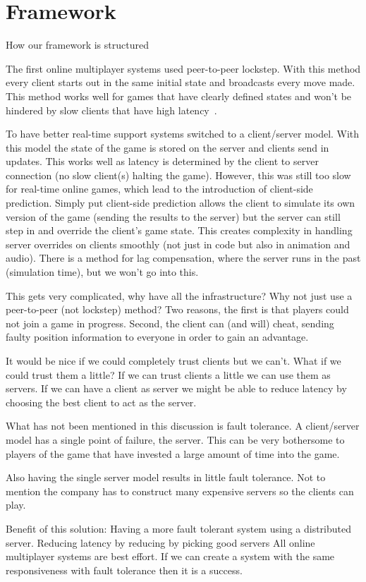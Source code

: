 
\section{Framework}
\label{sec:framework}

How our framework is structured

The first online multiplayer systems used peer-to-peer lockstep. With this method every client starts out in the same initial state and broadcasts every move made. This method works well for games that have clearly defined states and won’t be hindered by slow clients that have high latency~\cite{DOOMfaq}. 

To have better real-time support systems switched to a client/server model. With this model the state of the game is stored on the server and clients send in updates. This works well as latency is determined by the client to server connection (no slow client(s) halting the game). However, this was still too slow for real-time online games, which lead to the introduction of client-side prediction. Simply put client-side prediction allows the client to simulate its own version of the game (sending the results to the server) but the server can still step in and override the client's game state. This creates complexity in handling server overrides on clients smoothly (not just in code but also in animation and audio). There is a method for lag compensation, where the server runs in the past (simulation time), but we won’t go into this.

This gets very complicated, why have all the infrastructure? Why not just use a peer-to-peer (not lockstep) method? Two reasons, the first is that players could not join a game in progress. Second, the client can (and will) cheat, sending faulty position information to everyone in order to gain an advantage.

It would be nice if we could completely trust clients but we can’t. What if we could trust them a little? If we can trust clients a little we can use them as servers. If we can have a client as server we might be able to reduce latency by choosing the best client to act as the server.

What has not been mentioned in this discussion is fault tolerance. A client/server model has a single point of failure, the server. This can be very bothersome to players of the game that have invested a large amount of time into the game. 

Also having the single server model results in little fault tolerance. Not to mention the company has to construct many expensive servers so the clients can play.

Benefit of this solution:
Having a more fault tolerant system using a distributed server. 
Reducing latency by reducing by picking good servers
All online multiplayer systems are best effort. If we can create a system with the same responsiveness with fault tolerance then it is a success.